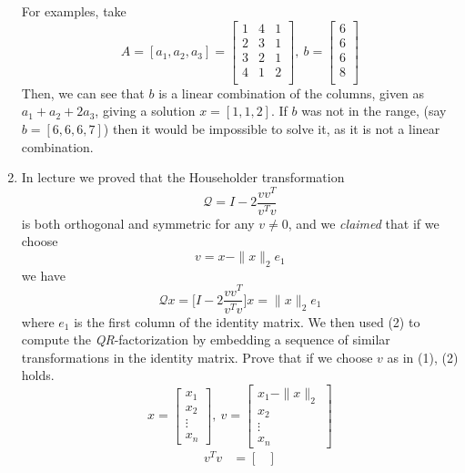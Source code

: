 \documentclass{article}
\newcommand{\twonorm}[1]{\| #1 \|_2}
\begin{document}
\begin{enumerate}
  For examples, take
  \[
      A = [a_1, a_2, a_3] = 
      \begin{bmatrix}
          1 & 4 & 1 \\
          2 & 3 & 1 \\
          3 & 2 & 1 \\
          4 & 1 & 2 \\
      \end{bmatrix}, \:
      b = \begin{bmatrix} 6\\ 6\\ 6\\ 8\\\end{bmatrix}
  \]
    Then, we can see that $b$ is a linear combination of the columns, given as $a_1 + a_2 + 2a_3$, giving a solution $x = [1, 1, 2]$. If $b$ was not in the range, (say $b = [6, 6, 6, 7]$) then it would be impossible to solve it, as it is not a linear combination.
  \newpage
  \item In lecture we proved that the Householder transformation
  \newcommand{\calQ}{\mathcal{Q}}
  \[ \calQ = I - 2 \frac{vv^T}{v^Tv} \]
  is both orthogonal and symmetric for any $v \not = 0$, and we \textit{claimed} that if we choose 
  \begin{equation}
      v = x - \twonorm{x}e_1
  \end{equation}
  we have
  \begin{equation}
      \calQ x = \Bigg[I - 2 \frac{vv^T}{v^Tv} \Bigg] x = \twonorm{x}e_1
  \end{equation}
  where $e_1$ is the first column of the identity matrix. We then used (2) to compute the \textit{QR}-factorization by embedding a sequence of similar transformations in the identity matrix.
  Prove that if we choose $v$ as in (1), (2) holds.
  {
  \everymath{\displaystyle}
  \[
  x = 
  \begin{bmatrix}
    x_1 \\
    x_2 \\
    \vdots \\
    x_n
  \end{bmatrix}
  , \: v = 
  \begin{bmatrix}
    x_1 - \twonorm{x} \\
    x_2 \\
    \vdots \\
    x_n
  \end{bmatrix}
  \]
  \begin{align*} v^Tv &= 
  \begin{bmatrix}

\end{bmatrix}
\end{align*}}
\end{enumerate}
\end{document}
